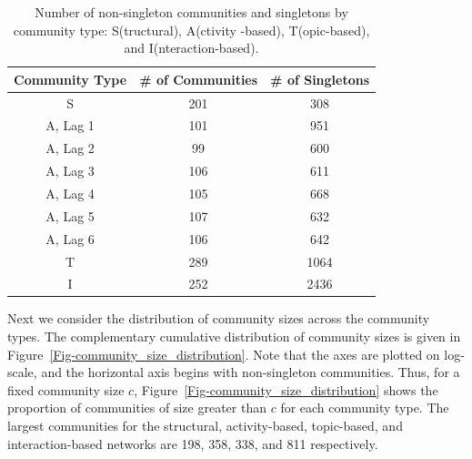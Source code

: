 \begin{table}[ht]
	\label{Table-comm_count}
	\caption{Number of non-singleton communities and singletons by community type: S(tructural), A(ctivity -based), T(opic-based), and I(nteraction-based).}
	\centering
	\begin{tabular}{| c | c | c |}
		\hline Community Type & \# of Communities & \# of Singletons \\ \hline
		S & 201 & 308 \\
		A, Lag 1 & 101 & 951 \\
		A, Lag 2 & 99 & 600 \\
		A, Lag 3 & 106 & 611 \\
		A, Lag 4 & 105 & 668 \\
		A, Lag 5 & 107 & 632 \\
		A, Lag 6 & 106 & 642 \\
		T & 289 & 1064 \\
		I & 252 & 2436 \\ \hline
	\end{tabular}
\end{table}

Next we consider the distribution of community sizes across the community types. The complementary cumulative distribution of community sizes is given in Figure~\ref{Fig-community_size_distribution}. Note that the axes are plotted on log-scale, and the horizontal axis begins with non-singleton communities. Thus, for a fixed community size $c$, Figure~\ref{Fig-community_size_distribution} shows the proportion of communities of size greater than $c$ for each community type. The largest communities for the structural, activity-based, topic-based, and interaction-based networks are 198, 358, 338, and 811 respectively.


